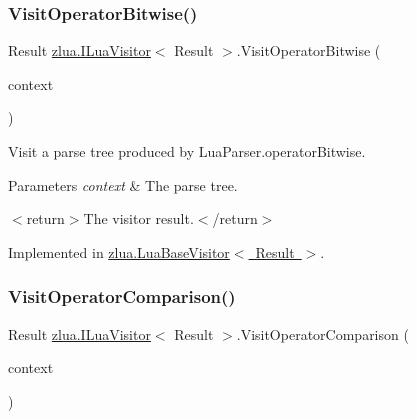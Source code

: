 \subsubsection{\texorpdfstring{Visit\+Operator\+Bitwise()}{VisitOperatorBitwise()}}
{\footnotesize\ttfamily Result \mbox{\hyperlink{interfacezlua_1_1_i_lua_visitor}{zlua.\+I\+Lua\+Visitor}}$<$ Result $>$.Visit\+Operator\+Bitwise (\begin{DoxyParamCaption}\item[{\mbox{[}\+Not\+Null\mbox{]} \mbox{\hyperlink{classzlua_1_1_lua_parser_1_1_operator_bitwise_context}{Lua\+Parser.\+Operator\+Bitwise\+Context}}}]{context }\end{DoxyParamCaption})}



Visit a parse tree produced by Lua\+Parser.\+operator\+Bitwise. 


\begin{DoxyParams}{Parameters}
{\em context} & The parse tree.\\
\hline
\end{DoxyParams}
$<$return$>$The visitor result.$<$/return$>$ 

Implemented in \mbox{\hyperlink{classzlua_1_1_lua_base_visitor_a024ddded01656d54d3819ca2f1e95e4e}{zlua.\+Lua\+Base\+Visitor$<$ Result $>$}}.

\mbox{\label{interfacezlua_1_1_i_lua_visitor_a981c3d7ed14831cde6805ea77ff4edeb}} 
\subsubsection{\texorpdfstring{Visit\+Operator\+Comparison()}{VisitOperatorComparison()}}
{\footnotesize\ttfamily Result \mbox{\hyperlink{interfacezlua_1_1_i_lua_visitor}{zlua.\+I\+Lua\+Visitor}}$<$ Result $>$.Visit\+Operator\+Comparison (\begin{DoxyParamCaption}\item[{\mbox{[}\+Not\+Null\mbox{]} \mbox{\hyperlink{classzlua_1_1_lua_parser_1_1_operator_comparison_context}{Lua\+Parser.\+Operator\+Comparison\+Context}}}]{context }\end{DoxyParamCaption})}



